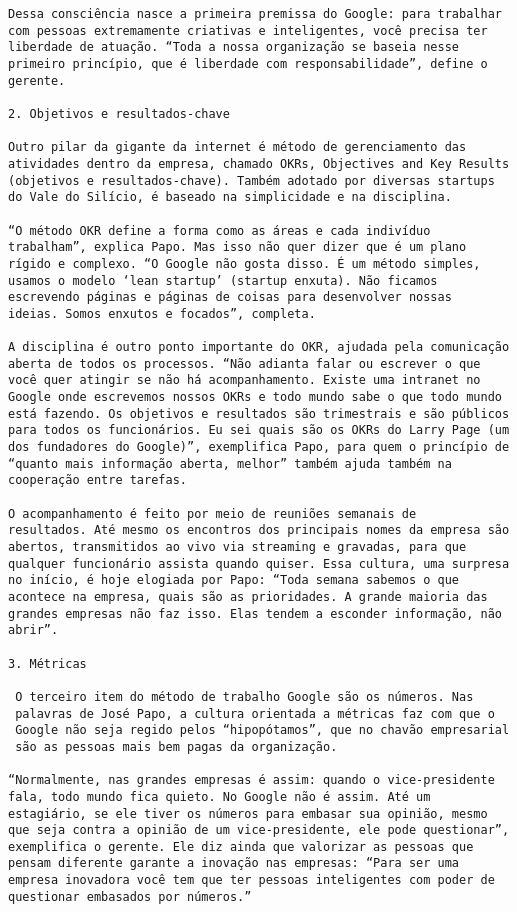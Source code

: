 \begin{verbatim}
Dessa consciência nasce a primeira premissa do Google: para trabalhar
com pessoas extremamente criativas e inteligentes, você precisa ter
liberdade de atuação. “Toda a nossa organização se baseia nesse
primeiro princípio, que é liberdade com responsabilidade”, define o
gerente.

2. Objetivos e resultados-chave

Outro pilar da gigante da internet é método de gerenciamento das
atividades dentro da empresa, chamado OKRs, Objectives and Key Results
(objetivos e resultados-chave). Também adotado por diversas startups
do Vale do Silício, é baseado na simplicidade e na disciplina.

“O método OKR define a forma como as áreas e cada indivíduo
trabalham”, explica Papo. Mas isso não quer dizer que é um plano
rígido e complexo. “O Google não gosta disso. É um método simples,
usamos o modelo ‘lean startup’ (startup enxuta). Não ficamos
escrevendo páginas e páginas de coisas para desenvolver nossas
ideias. Somos enxutos e focados”, completa.

A disciplina é outro ponto importante do OKR, ajudada pela comunicação
aberta de todos os processos. “Não adianta falar ou escrever o que
você quer atingir se não há acompanhamento. Existe uma intranet no
Google onde escrevemos nossos OKRs e todo mundo sabe o que todo mundo
está fazendo. Os objetivos e resultados são trimestrais e são públicos
para todos os funcionários. Eu sei quais são os OKRs do Larry Page (um
dos fundadores do Google)”, exemplifica Papo, para quem o princípio de
“quanto mais informação aberta, melhor” também ajuda também na
cooperação entre tarefas.

O acompanhamento é feito por meio de reuniões semanais de
resultados. Até mesmo os encontros dos principais nomes da empresa são
abertos, transmitidos ao vivo via streaming e gravadas, para que
qualquer funcionário assista quando quiser. Essa cultura, uma surpresa
no início, é hoje elogiada por Papo: “Toda semana sabemos o que
acontece na empresa, quais são as prioridades. A grande maioria das
grandes empresas não faz isso. Elas tendem a esconder informação, não
abrir”.

3. Métricas

 O terceiro item do método de trabalho Google são os números. Nas
 palavras de José Papo, a cultura orientada a métricas faz com que o
 Google não seja regido pelos “hipopótamos”, que no chavão empresarial
 são as pessoas mais bem pagas da organização.

“Normalmente, nas grandes empresas é assim: quando o vice-presidente
fala, todo mundo fica quieto. No Google não é assim. Até um
estagiário, se ele tiver os números para embasar sua opinião, mesmo
que seja contra a opinião de um vice-presidente, ele pode questionar”,
exemplifica o gerente. Ele diz ainda que valorizar as pessoas que
pensam diferente garante a inovação nas empresas: “Para ser uma
empresa inovadora você tem que ter pessoas inteligentes com poder de
questionar embasados por números.”


\end{verbatim}
